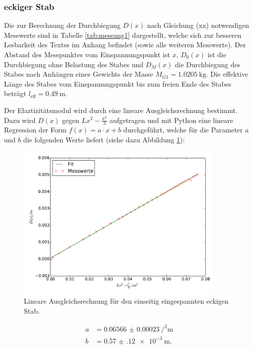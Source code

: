 \subsubsection{eckiger Stab}
Die zur Berechnung der Durchbiegung $D(x)$ nach Gleichung (xx) notwendigen Messwerte
sind in Tabelle \ref{tab:messung1} dargestellt, welche sich zur besseren Lesbarkeit
des Textes im Anhang befindet (sowie alle weiteren Messwerte).\newline
Der Abstand des Messpunktes vom Einspannungspunkt ist $x$, $D_0(x)$ ist die
Durchbiegung ohne Belastung des Stabes und $D_M(x)$ die Durchbiegung des Stabes
nach Anhängen eines Gewichts der Masse $M_{G1} = \SI{1.0205}{\kilo\gram}$. Die
effektive Länge des Stabes vom Einspannungspunkt bis zum freien Ende des Stabes
beträgt $l_\text{eff} = \SI{0.49}{\meter}$.

Der Elaztizitätsmodul wird durch eine lineare Ausgleichsrechnung bestimmt. Dazu
wird $D(x)$ gegen $L x^2 - \frac{x^3}{3}$ aufgetragen und mit Python eine lineare
Regression der Form $f(x) = a \cdot x + b$ durchgeführt, welche für die Parameter
$a$ und $b$ die folgenden Werte liefert (siehe dazu Abbildung
\ref{fig:plot_einseitig1}):
\begin{figure}
  \centering
  \includegraphics[width=0.9\textwidth]{stab1_einseitig.pdf}
  \caption{Lineare Ausgleichsrechnung für den einseitig eingespannten eckigen Stab.}
  \label{fig:plot_einseitig1}
\end{figure}
\begin{align*}
  a &= \SI{0.06566(23)}{\per\squared\meter} \\
  b &= \SI{0.57(12)e-3}{\meter}.
\end{align*}

